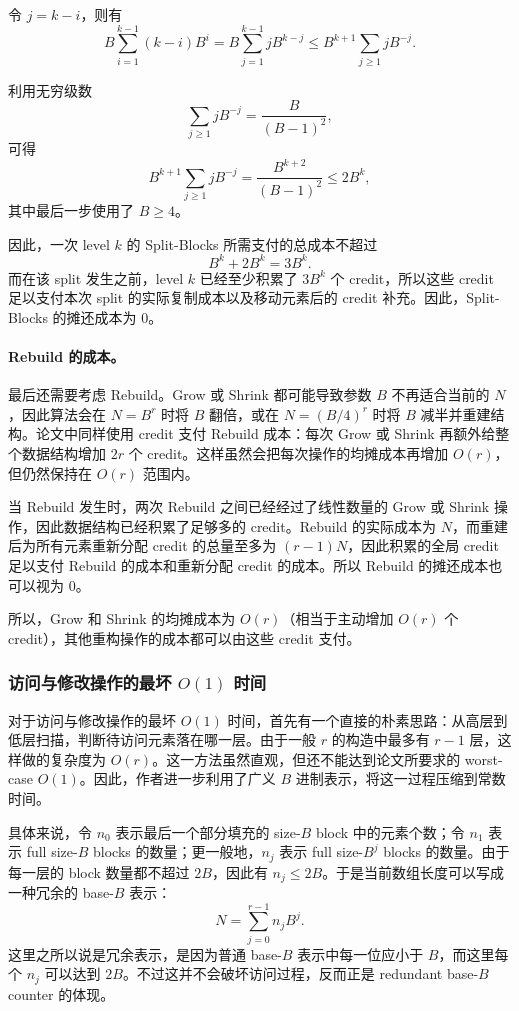\documentclass[12pt,a4paper]{article}
\begin{document}
令 $j=k-i$，则有
\[
B\sum_{i=1}^{k-1}(k-i)B^i
=
B\sum_{j=1}^{k-1}jB^{k-j}
\le
B^{k+1}\sum_{j\ge 1}jB^{-j}.
\]

利用无穷级数
\[
\sum_{j\ge 1}jB^{-j}=\frac{B}{(B-1)^2},
\]
可得
\[
B^{k+1}\sum_{j\ge 1}jB^{-j}
=
\frac{B^{k+2}}{(B-1)^2}
\le
2B^k,
\]
其中最后一步使用了 $B\ge 4$。

因此，一次 level $k$ 的 Split-Blocks 所需支付的总成本不超过
\[
B^k+2B^k=3B^k.
\]
而在该 split 发生之前，level $k$ 已经至少积累了 $3B^k$ 个 credit，所以这些 credit 足以支付本次 split 的实际复制成本以及移动元素后的 credit 补充。因此，Split-Blocks 的摊还成本为 $0$。

\paragraph{Rebuild 的成本。}

最后还需要考虑 Rebuild。Grow 或 Shrink 都可能导致参数 $B$ 不再适合当前的 $N$，因此算法会在 $N=B^r$ 时将 $B$ 翻倍，或在 $N=(B/4)^r$ 时将 $B$ 减半并重建结构。论文中同样使用 credit 支付 Rebuild 成本：每次 Grow 或 Shrink 再额外给整个数据结构增加 $2r$ 个 credit。这样虽然会把每次操作的均摊成本再增加 $O(r)$，但仍然保持在 $O(r)$ 范围内。

当 Rebuild 发生时，两次 Rebuild 之间已经经过了线性数量的 Grow 或 Shrink 操作，因此数据结构已经积累了足够多的 credit。Rebuild 的实际成本为 $N$，而重建后为所有元素重新分配 credit 的总量至多为 $(r-1)N$，因此积累的全局 credit 足以支付 Rebuild 的成本和重新分配 credit 的成本。所以 Rebuild 的摊还成本也可以视为 $0$。

所以，Grow 和 Shrink 的均摊成本为 $O(r)$（相当于主动增加 $O(r)$ 个 credit），其他重构操作的成本都可以由这些 credit 支付。

\subsubsection{访问与修改操作的最坏 $O(1)$ 时间}

对于访问与修改操作的最坏 $O(1)$ 时间，首先有一个直接的朴素思路：从高层到低层扫描，判断待访问元素落在哪一层。由于一般 $r$ 的构造中最多有 $r-1$ 层，这样做的复杂度为 $O(r)$。这一方法虽然直观，但还不能达到论文所要求的 worst-case $O(1)$。因此，作者进一步利用了广义 $B$ 进制表示，将这一过程压缩到常数时间。

具体来说，令 $n_0$ 表示最后一个部分填充的 size-$B$ block 中的元素个数；令 $n_1$ 表示 full size-$B$ blocks 的数量；更一般地，$n_j$ 表示 full size-$B^j$ blocks 的数量。由于每一层的 block 数量都不超过 $2B$，因此有 $n_j\le 2B$。于是当前数组长度可以写成一种冗余的 base-$B$ 表示：
\[
N=\sum_{j=0}^{r-1} n_jB^j.
\]
这里之所以说是冗余表示，是因为普通 base-$B$ 表示中每一位应小于 $B$，而这里每个 $n_j$ 可以达到 $2B$。不过这并不会破坏访问过程，反而正是 redundant base-$B$ counter 的体现。
\end{document}
